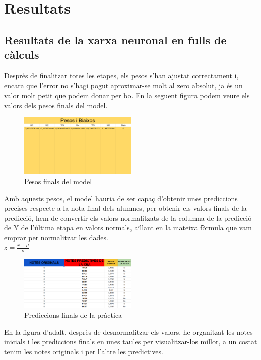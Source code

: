 \chapter{Resultats}
\label{c:Resultats}
\section{Resultats de la xarxa neuronal en fulls de càlculs}
Desprès de finalitzar totes les etapes, els pesos s'han ajustat correctament i, encara que l'error no s'hagi pogut aproximar-se molt al zero absolut, ja és un valor molt petit que podem donar per bo. En la seguent figura podem veure els valors dels pesos finals del model.

\begin{figure}[H]
    \centering
    \includegraphics[width=0.5\textwidth]{./figures/Pesos_finals.png}
    \caption{Pesos finals del model}
\end{figure}

Amb aquests pesos, el model hauria de ser capaç d'obtenir unes prediccions precises respecte a la nota final dels alumnes, per obtenir els valors finals de la predicció, hem de convertir els valors normalitzats de la columna de la predicció de Y de l'última etapa en valors normals, aïllant en la mateixa fòrmula que vam emprar per normalitzar les dades.\\
$z = \frac{x - \mu}{\sigma}$\\

\begin{figure}[H]
    \centering
    \includegraphics[width=0.5\textwidth]{./figures/Resultat_final.png}
    \caption{Prediccions finals de la pràctica}
\end{figure}

En la figura d'adalt, desprès de desnormalitzar els valors, he organitzat les notes inicials i les prediccions finals en unes taules per visualitzar-los millor, a un costat tenim les notes originals i per l'altre les predictives.

